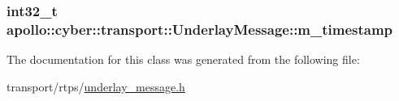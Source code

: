 \hypertarget{classapollo_1_1cyber_1_1transport_1_1UnderlayMessage_a112c0605b3ef12751587c80d090a0ecb}{
\subsubsection[{m\-\_\-timestamp}]{\setlength{\rightskip}{0pt plus 5cm}int32\-\_\-t apollo\-::cyber\-::transport\-::\-Underlay\-Message\-::m\-\_\-timestamp\hspace{0.3cm}{\ttfamily [private]}}}\label{classapollo_1_1cyber_1_1transport_1_1UnderlayMessage_a112c0605b3ef12751587c80d090a0ecb}


The documentation for this class was generated from the following file\-:\begin{DoxyCompactItemize}
\item 
transport/rtps/\hyperlink{underlay__message_8h}{underlay\-\_\-message.\-h}\end{DoxyCompactItemize}
